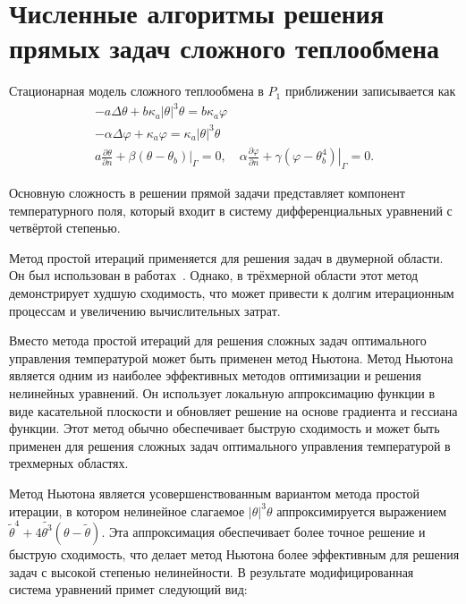 \section{Численные алгоритмы решения прямых задач сложного теплообмена}
\label{sec:ch4/sec1}
Стационарная модель сложного теплообмена
в $P_1$ приближении записывается как
\[
    \begin{gathered}
        -a \Delta \theta+b \kappa_{a}| \theta|^{3} \theta =
        b \kappa_{a} \varphi \\
        -\alpha \Delta \varphi+\kappa_{a} \varphi =
        \kappa_{a}|\theta|^{3} \theta \\
        a \frac{\partial \theta}{\partial n}
        +\left.\beta\left(\theta-\theta_{b}\right)\right|_{\Gamma}=0,
        \quad \alpha \frac{\partial \varphi}{\partial n}
        +\left.\gamma\left(\varphi-\theta_{b}^{4}\right)\right|_{\Gamma}=0.
    \end{gathered}
\]

Основную сложность в решении прямой задачи представляет компонент
температурного поля, который входит в систему
дифференциальных уравнений с четвёртой степенью.

Метод простой итераций применяется для решения задач в двумерной области.
Он был использован в работах~\cite{astrakhantseva2014numerical, Kovtanyuk2015}.
Однако, в трёхмерной области этот метод демонстрирует худшую сходимость,
что может привести к долгим итерационным
процессам и увеличению вычислительных затрат.

Вместо метода простой итераций для решения сложных задач оптимального управления
температурой может быть применен метод Ньютона.
Метод Ньютона является одним из наиболее эффективных методов оптимизации
и решения нелинейных уравнений.
Он использует локальную аппроксимацию функции в виде касательной плоскости
и обновляет решение на основе градиента и гессиана функции.
Этот метод обычно обеспечивает быструю сходимость и может быть
применен для решения сложных задач оптимального
управления температурой в трехмерных областях.


Метод Ньютона является усовершенствованным вариантом метода простой итерации,
в котором нелинейное слагаемое $|\theta|^3 \theta$ аппроксимируется
выражением $\widetilde{\theta}^4+4 \widetilde{\theta^3}(\theta-\widetilde{\theta})$.
Эта аппроксимация обеспечивает более точное решение и быструю сходимость,
что делает метод Ньютона более эффективным для
решения задач с высокой степенью нелинейности.
В результате модифицированная система уравнений примет следующий вид:

